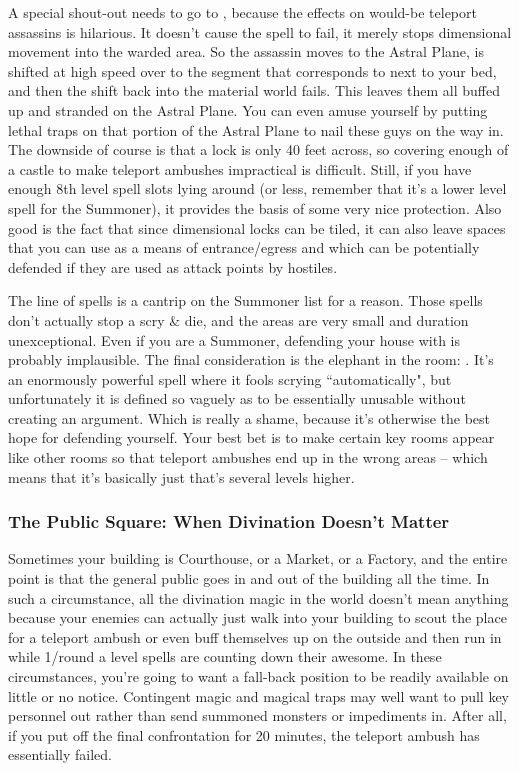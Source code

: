 A special shout-out needs to go to , because the effects on would-be teleport assassins is hilarious. It doesn't cause the spell to fail, it merely stops dimensional movement into the warded area. So the assassin moves to the Astral Plane, is shifted at high speed over to the segment that corresponds to next to your bed, and then the shift back into the material world fails. This leaves them all buffed up and stranded on the Astral Plane. You can even amuse yourself by putting lethal traps on that portion of the Astral Plane to nail these guys on the way in. The downside of course is that a lock is only 40 feet across, so covering enough of a castle to make teleport ambushes impractical is difficult. Still, if you have enough 8th level spell slots lying around (or less, remember that it's a lower level spell for the Summoner), it provides the basis of some very nice protection. Also good is the fact that since dimensional locks can be tiled, it can also leave spaces that you can use as a means of entrance/egress and which can be potentially defended if they are used as attack points by hostiles.

The  line of spells is a cantrip on the Summoner list for a reason. Those spells don't actually stop a scry \& die, and the areas are very small and duration unexceptional. Even if you are a Summoner, defending your house with  is probably implausible. The final consideration is the elephant in the room: . It's an enormously powerful spell where it fools scrying ``automatically", but unfortunately it is defined so vaguely as to be essentially unusable without creating an argument. Which is really a shame, because it's otherwise the best hope for defending yourself. Your best bet is to make certain key rooms appear like other rooms so that teleport ambushes end up in the wrong areas -- which means that it's basically just  that's several levels higher.

\subsubsection{The Public Square: When Divination Doesn't Matter}

Sometimes your building is Courthouse, or a Market, or a Factory, and the entire point is that the general public goes in and out of the building all the time. In such a circumstance, all the divination magic in the world doesn't mean anything because your enemies can actually just walk into your building to scout the place for a teleport ambush or even buff themselves up on the outside and then run in while 1/round a level spells are counting down their awesome. In these circumstances, you're going to want a fall-back position to be readily available on little or no notice. Contingent magic and magical traps may well want to pull key personnel out rather than send summoned monsters or impediments in. After all, if you put off the final confrontation for 20 minutes, the teleport ambush has essentially failed.

